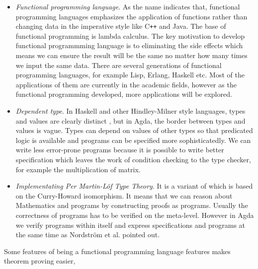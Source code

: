 \begin{itemize}

\item \textit{Functional programming language}. As the name indicates that, functional programming languages emphasizes the application of functions rather than changing data in the imperative style like C{}\verb!++! and Java. The base of functional programming is lambda calculus. The key motivation to develop functional programmming language is to eliminating the side effects which means we can ensure the result will be the same no matter how many times we input the same data. There are several generations of functional programming languages, for example Lisp, Erlang, Haskell etc. Most of the applications of them are currently in the academic fields, however as the functional programming developed, more applications will be explored.

\item \textit{Dependent type}. 
In Haskell and other Hindley-Milner style languages, types and values are clearly distinct \cite{tutorial}, but in Agda, the border between types and values is vague. Types can depend on values of other types \cite{dtw} so that predicated logic is available and programs can be specified more sophisticatedly. We can write less error-prone programs because it is possible to write better specification which leaves the work of condition checking to the type checker, for example the multiplication of matrix.


\item \textit{Implementating Per Martin-Löf Type Theory}. It is a variant of \itt which is based on the Curry-Howard isomorphism\cite{aboa}. It means that we can reason about Mathematics and programs by constructing proofs as programs. Usually the correctness of programs has to be verified on the meta-level. However in Agda we verify programs within itself and express specifications and  programs at the same time as Nordström et al. \cite{nps} pointed out.
\end{itemize}




Some features of being a functional programming language features makes theorem proving easier,

